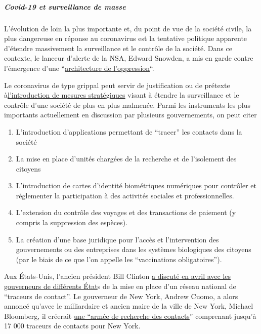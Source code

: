 \hypertarget{covid-19-et-surveillance-de-masse}{%
\subparagraph{\texorpdfstring{\textbf{Covid-19 et surveillance de
masse}}{Covid-19 et surveillance de masse}}\label{covid-19-et-surveillance-de-masse}}

L'évolution de loin la plus importante et, du point de vue de la société
civile, la plus dangereuse en réponse au coronavirus est la tentative
politique apparente d'étendre massivement la surveillance et le contrôle
de la société. Dans ce contexte, le lanceur d'alerte de la NSA, Edward
Snowden, a mis en garde contre l'émergence d'une
``\href{https://www.vice.com/en_us/article/bvge5q/snowden-warns-governments-are-using-coronavirus-to-build-the-architecture-of-oppression}{architecture
de l'oppression}``.

Le coronavirus de type grippal peut servir de justification ou de
prétexte
à\href{https://norberthaering.de/die-regenten-der-welt/id2020-ktdi-apple-google/}{l'introduction
de mesures stratégiques} visant à étendre la surveillance et le contrôle
d'une société de plus en plus malmenée. Parmi les instruments les plus
importants actuellement en discussion par plusieurs gouvernements, on
peut citer

\begin{enumerate}
\def\labelenumi{\arabic{enumi}.}
\tightlist
\item
  L'introduction d'applications permettant de ``tracer'' les contacts
  dans la société
\item
  La mise en place d'unités chargées de la recherche et de l'isolement
  des citoyens
\item
  L'introduction de cartes d'identité biométriques numériques pour
  contrôler et réglementer la participation à des activités sociales et
  professionnelles.
\item
  L'extension du contrôle des voyages et des transactions de paiement (y
  compris la suppression des espèces).
\item
  La création d'une base juridique pour l'accès et l'intervention des
  gouvernements ou des entreprises dans les systèmes biologiques des
  citoyens (par le biais de ce que l'on appelle les ``vaccinations
  obligatoires'').
\end{enumerate}

Aux États-Unis, l'ancien président Bill Clinton
\href{https://www.youtube.com/watch?v=-Ug9XHT9JQQ}{a discuté en avril
avec les gouverneurs de différents État}s de la mise en place d'un
réseau national de ``traceurs de contact''. Le gouverneur de New York,
Andrew Cuomo, a alors annoncé qu'avec le milliardaire et ancien maire de
la ville de New York, Michael Bloomberg, il créerait
\href{https://www.cbsnews.com/news/contact-tracing-new-york-cuomo-plan/}{une
``armée de recherche des contacts}'' comprenant jusqu'à 17 000 traceurs
de contacts pour New York.

